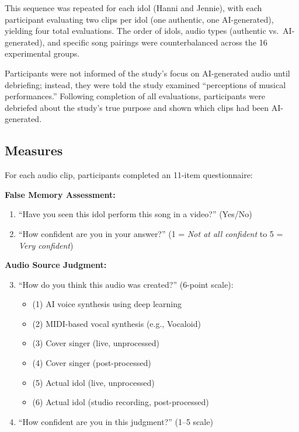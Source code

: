 \documentclass[12pt, a4paper]{article}
\begin{document}
This sequence was repeated for each idol (Hanni and Jennie), with each participant evaluating two clips per idol (one authentic, one AI-generated), yielding four total evaluations. The order of idols, audio types (authentic vs.\ AI-generated), and specific song pairings were counterbalanced across the 16 experimental groups.

Participants were not informed of the study's focus on AI-generated audio until debriefing; instead, they were told the study examined ``perceptions of musical performances.'' Following completion of all evaluations, participants were debriefed about the study's true purpose and shown which clips had been AI-generated.

\subsection{Measures}

For each audio clip, participants completed an 11-item questionnaire:

\textbf{False Memory Assessment:}
\begin{enumerate}
    \item ``Have you seen this idol perform this song in a video?'' (Yes/No)
    \item ``How confident are you in your answer?'' (1 = \textit{Not at all confident} to 5 = \textit{Very confident})
\end{enumerate}

\textbf{Audio Source Judgment:}
\begin{enumerate}
    \setcounter{enumi}{2}
    \item ``How do you think this audio was created?'' (6-point scale):
    \begin{itemize}
        \item (1) AI voice synthesis using deep learning
        \item (2) MIDI-based vocal synthesis (e.g., Vocaloid)
        \item (3) Cover singer (live, unprocessed)
        \item (4) Cover singer (post-processed)
        \item (5) Actual idol (live, unprocessed)
        \item (6) Actual idol (studio recording, post-processed)
    \end{itemize}
    \item ``How confident are you in this judgment?'' (1--5 scale)
\end{enumerate}
\end{document}
